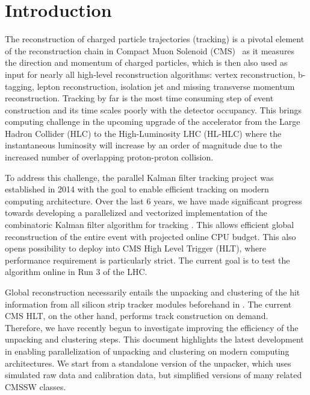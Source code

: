 \documentclass[10pt, paper=a4, UKenglish]{article}
\begin{document}
\normalsize 


\section{Introduction}
\label{intro}
The reconstruction of charged particle trajectories (tracking) is a pivotal element of the reconstruction chain in Compact Muon Solenoid (CMS)~\cite{Chatrchyan:2008aa} as it measures the direction and momentum of charged particles, which is then also used as input for nearly all high-level reconstruction algorithms: vertex reconstruction, b-tagging, lepton reconstruction, isolation jet and missing transverse momentum reconstruction. Tracking by far is the most time consuming step of event construction and its time scales poorly with the detector occupancy. This brings computing challenge in the upcoming upgrade of the accelerator from the Large Hadron Collider (HLC) to the High-Luminosity LHC (HL-HLC) where the instantaneous luminosity will increase by an order of magnitude due to the increased number of overlapping proton-proton collision.

To address this challenge, the parallel Kalman filter tracking project \mkFit was established in 2014 with the goal to enable efficient tracking on modern computing architecture. Over the last 6 years, we have made significant progress towards developing a parallelized and vectorized implementation of the combinatoric Kalman filter algorithm for tracking \cite{Cerati_2017,Cerati_2019,2019arXiv190611744C,2020arXiv200206295C}. This allows efficient global reconstruction of the entire event with projected online CPU budget. This also opens possibility to deploy \mkFit into CMS High Level Trigger (HLT), where performance requirement is particularly strict. The current goal is to test the algorithm online in Run 3 of the LHC. 

Global reconstruction necessarily entails the unpacking and clustering of the hit information from all silicon strip tracker modules beforehand in \mkFit. The current CMS HLT, on the other hand, performs track construction on demand. Therefore, we have recently begun to investigate improving the efficiency of the unpacking and clustering steps. This document highlights the latest development in enabling parallelization of unpacking and clustering on modern computing architectures. We start from a standalone version of the unpacker, which uses simulated raw data and calibration data, but simplified versions of many related CMSSW classes. 
\end{document}
